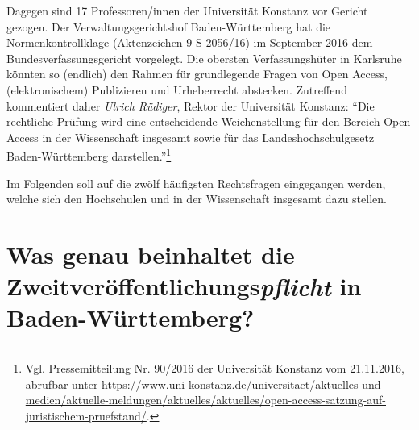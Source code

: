 \documentclass[a4paper,
fontsize=11pt,
oneside,
numbers=noperiodatend,
parskip=half-,
bibliography=totoc,
final
]{scrartcl}
\begin{document}
Dagegen sind 17 Professoren/innen der Universität Konstanz vor Gericht
gezogen. Der Verwaltungsgerichtshof Baden-Württemberg hat die
Normenkontrollklage (Aktenzeichen 9 S 2056/16) im September 2016 dem
Bundesverfassungsgericht vorgelegt. Die obersten Verfassungshüter in
Karlsruhe könnten so (endlich) den Rahmen für grundlegende Fragen von
Open Access, (elektronischem) Publizieren und Urheberrecht abstecken.
Zutreffend kommentiert daher \emph{Ulrich Rüdiger}, Rektor der
Universität Konstanz: \enquote{Die rechtliche Prüfung wird eine
entscheidende Weichenstellung für den Bereich Open Access in der
Wissenschaft insgesamt sowie für das Landeshochschulgesetz
Baden-Württemberg darstellen.}\footnote{Vgl. Pressemitteilung Nr.
  90/2016 der Universität Konstanz vom 21.11.2016, abrufbar unter
  \url{https://www.uni-konstanz.de/universitaet/aktuelles-und-medien/aktuelle-meldungen/aktuelles/aktuelles/open-access-satzung-auf-juristischem-pruefstand/}.}

Im Folgenden soll auf die zwölf häufigsten Rechtsfragen eingegangen
werden, welche sich den Hochschulen und in der Wissenschaft insgesamt
dazu stellen.

\hypertarget{was-genau-beinhaltet-die-zweitveruxf6ffentlichungspflicht-in-baden-wuxfcrttemberg}{%
\section*{\texorpdfstring{Was genau beinhaltet die
Zweit\-ver\-öffent\-lich\-ungs\-\emph{pflicht} in
Baden-Württemberg?}{Was genau beinhaltet die Zweit\-ver\-öffent\-lich\-ungs\-pflicht in Baden-Württemberg?}}\label{was-genau-beinhaltet-die-zweitveruxf6ffentlichungspflicht-in-baden-wuxfcrttemberg}}
\end{document}
